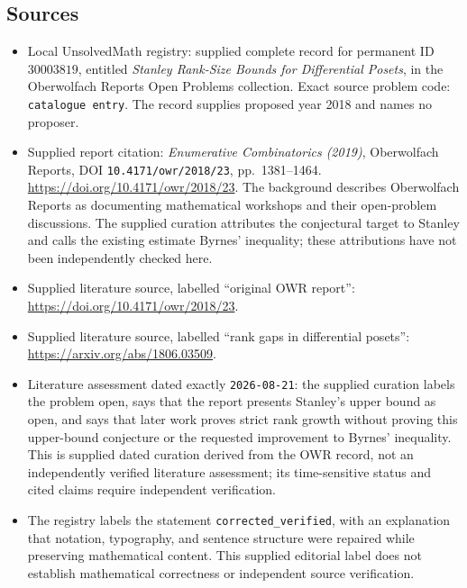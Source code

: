 \documentclass[11pt]{article}
\begin{document}
\subsection{Sources}
\begin{itemize}
\item Local UnsolvedMath registry: supplied complete record for permanent ID \(30003819\), entitled \emph{Stanley Rank-Size Bounds for Differential Posets}, in the Oberwolfach Reports Open Problems collection. Exact source problem code: \texttt{catalogue entry}. The record supplies proposed year 2018 and names no proposer.
\item Supplied report citation: \emph{Enumerative Combinatorics (2019)}, Oberwolfach Reports, DOI \texttt{10.4171/owr/2018/23}, pp.\ 1381--1464. \url{https://doi.org/10.4171/owr/2018/23}. The background describes Oberwolfach Reports as documenting mathematical workshops and their open-problem discussions. The supplied curation attributes the conjectural target to Stanley and calls the existing estimate Byrnes' inequality; these attributions have not been independently checked here.
\item Supplied literature source, labelled ``original OWR report'': \url{https://doi.org/10.4171/owr/2018/23}.
\item Supplied literature source, labelled ``rank gaps in differential posets'': \url{https://arxiv.org/abs/1806.03509}.
\item Literature assessment dated exactly \texttt{2026-08-21}: the supplied curation labels the problem open, says that the report presents Stanley's upper bound as open, and says that later work proves strict rank growth without proving this upper-bound conjecture or the requested improvement to Byrnes' inequality. This is supplied dated curation derived from the OWR record, not an independently verified literature assessment; its time-sensitive status and cited claims require independent verification.
\item The registry labels the statement \texttt{corrected\_verified}, with an explanation that notation, typography, and sentence structure were repaired while preserving mathematical content. This supplied editorial label does not establish mathematical correctness or independent source verification.
\end{itemize}
\end{document}
